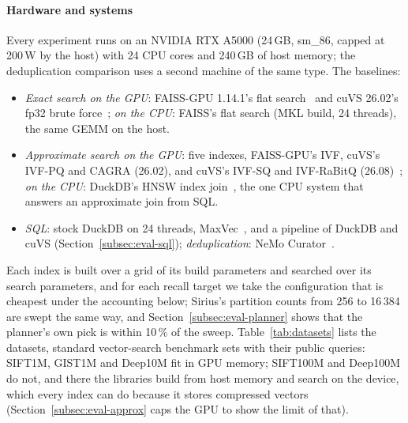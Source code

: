 \paragraph{Hardware and systems}
Every experiment runs on an NVIDIA RTX A5000 (24\,GB, sm\_86, capped at 200\,W by the host) with 24 CPU cores and 240\,GB of host memory; the deduplication comparison uses a second machine of the same type.
The baselines:
\begin{itemize}\setlength{\itemsep}{1pt}
    \item \emph{Exact search on the GPU}: FAISS-GPU 1.14.1's flat search~\cite{JohnsonFaissGPU21} and cuVS 26.02's fp32 brute force~\cite{NvidiaCuVS26}; \emph{on the CPU}: FAISS's flat search (MKL build, 24 threads), the same GEMM on the host.
    \item \emph{Approximate search on the GPU}: five indexes, FAISS-GPU's IVF, cuVS's IVF-PQ and CAGRA (26.02), and cuVS's IVF-SQ and IVF-RaBitQ (26.08)~\cite{OotomoCAGRA24, ShiIVFRaBitQ26}; \emph{on the CPU}: DuckDB's HNSW index join~\cite{DuckDBVSSBlog24}, the one CPU system that answers an approximate join from SQL.
    \item \emph{SQL}: stock DuckDB on 24 threads, MaxVec~\cite{MaxVec26}, and a pipeline of DuckDB and cuVS (Section~\ref{subsec:eval-sql}); \emph{deduplication}: NeMo Curator~\cite{NeMoCurator}.
\end{itemize}
Each index is built over a grid of its build parameters and searched over its search parameters, and for each recall target we take the configuration that is cheapest under the accounting below; Sirius's partition counts from 256 to 16\,384 are swept the same way, and Section~\ref{subsec:eval-planner} shows that the planner's own pick is within 10\,\% of the sweep.
Table~\ref{tab:datasets} lists the datasets, standard vector-search benchmark sets with their public queries: SIFT1M, GIST1M and Deep10M fit in GPU memory; SIFT100M and Deep100M do not, and there the libraries build from host memory and search on the device, which every index can do because it stores compressed vectors (Section~\ref{subsec:eval-approx} caps the GPU to show the limit of that).

